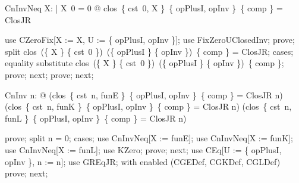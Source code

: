 \documentclass{article}
\begin{document}
\begin{theorem}{CnInvNeq}
  \forall X: \nat \fun \nat | X~0 = 0 @ \lnot clos~\{ cst~0, X \}~\{ opPlusI, opInv \}~\{ comp \} = ClosJR
\end{theorem}

\begin{zproof}
use CZeroFix[X := X, U := \{ opPlusI, opInv \}];
use FixZeroUClosedInv;
prove;
split clos~(\{ X \} \cup \{ cst~0 \})~(\{ opPlusI \} \cup \{ opInv \})~\{ comp \} = ClosJR;
cases;
equality substitute clos~(\{ X \} \cup \{ cst~0 \})~(\{ opPlusI \} \cup \{ opInv \})~\{ comp \};
prove;
next;
prove;
next;
\end{zproof}

\begin{theorem}{CnInv}
  \forall n: \nat @ (clos~\{ cst~n, funE \}~\{ opPlusI, opInv \}~\{ comp \} = ClosJR  \leq n) \land (clos~\{ cst~n, funK \}~\{ opPlusI, opInv \}~\{ comp \} = ClosJR  \leq n) \land (clos~\{ cst~n, funL \}~\{ opPlusI, opInv \}~\{ comp \} = ClosJR  \leq n)
\end{theorem}

\begin{zproof}
prove;
split n = 0;
cases;
use CnInvNeq[X := funE];
use CnInvNeq[X := funK];
use CnInvNeq[X := funL];
use KZero;
prove;
next;
use CEq[U := \{ opPlusI, opInv \}, n := n];
use GREqJR;
with enabled (CGEDef, CGKDef, CGLDef) prove;
next;
\end{zproof}
\end{document}
